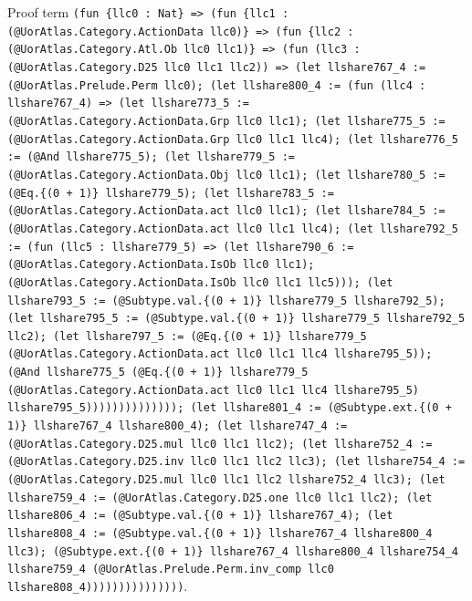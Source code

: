 \documentclass[11pt]{article}
\begin{document}
\noindent Proof term \texttt{(fun \{llc0 : Nat\} => (fun \{llc1 : (@UorAtlas.Category.ActionData llc0)\} => (fun \{llc2 : (@UorAtlas.Category.Atl.Ob llc0 llc1)\} => (fun (llc3 : (@UorAtlas.Category.D25 llc0 llc1 llc2)) => (let llshare767\_4 := (@UorAtlas.Prelude.Perm llc0); (let llshare800\_4 := (fun (llc4 : llshare767\_4) => (let llshare773\_5 := (@UorAtlas.Category.ActionData.Grp llc0 llc1); (let llshare775\_5 := (@UorAtlas.Category.ActionData.Grp llc0 llc1 llc4); (let llshare776\_5 := (@And llshare775\_5); (let llshare779\_5 := (@UorAtlas.Category.ActionData.Obj llc0 llc1); (let llshare780\_5 := (@Eq.\{(0 + 1)\} llshare779\_5); (let llshare783\_5 := (@UorAtlas.Category.ActionData.act llc0 llc1); (let llshare784\_5 := (@UorAtlas.Category.ActionData.act llc0 llc1 llc4); (let llshare792\_5 := (fun (llc5 : llshare779\_5) => (let llshare790\_6 := (@UorAtlas.Category.ActionData.IsOb llc0 llc1); (@UorAtlas.Category.ActionData.IsOb llc0 llc1 llc5))); (let llshare793\_5 := (@Subtype.val.\{(0 + 1)\} llshare779\_5 llshare792\_5); (let llshare795\_5 := (@Subtype.val.\{(0 + 1)\} llshare779\_5 llshare792\_5 llc2); (let llshare797\_5 := (@Eq.\{(0 + 1)\} llshare779\_5 (@UorAtlas.Category.ActionData.act llc0 llc1 llc4 llshare795\_5)); (@And llshare775\_5 (@Eq.\{(0 + 1)\} llshare779\_5 (@UorAtlas.Category.ActionData.act llc0 llc1 llc4 llshare795\_5) llshare795\_5)))))))))))))); (let llshare801\_4 := (@Subtype.ext.\{(0 + 1)\} llshare767\_4 llshare800\_4); (let llshare747\_4 := (@UorAtlas.Category.D25.mul llc0 llc1 llc2); (let llshare752\_4 := (@UorAtlas.Category.D25.inv llc0 llc1 llc2 llc3); (let llshare754\_4 := (@UorAtlas.Category.D25.mul llc0 llc1 llc2 llshare752\_4 llc3); (let llshare759\_4 := (@UorAtlas.Category.D25.one llc0 llc1 llc2); (let llshare806\_4 := (@Subtype.val.\{(0 + 1)\} llshare767\_4); (let llshare808\_4 := (@Subtype.val.\{(0 + 1)\} llshare767\_4 llshare800\_4 llc3); (@Subtype.ext.\{(0 + 1)\} llshare767\_4 llshare800\_4 llshare754\_4 llshare759\_4 (@UorAtlas.Prelude.Perm.inv\_comp llc0 llshare808\_4)))))))))))))))}.\par
\end{document}
